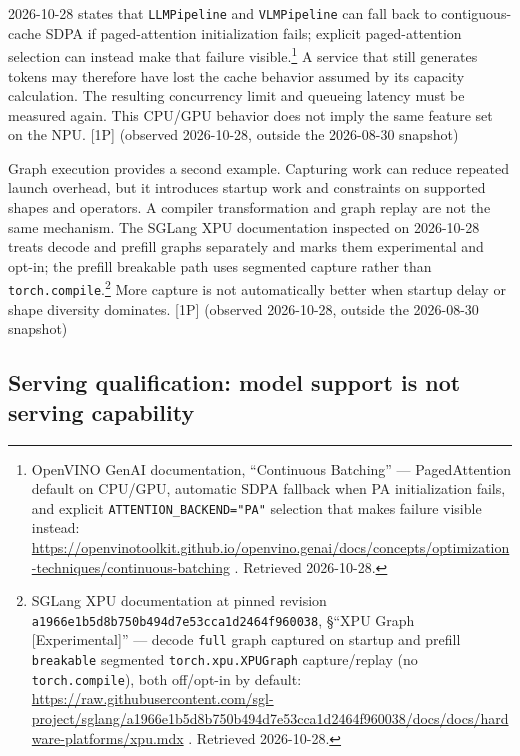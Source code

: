 2026-10-28 states that \texttt{LLMPipeline} and \texttt{VLMPipeline} can
fall back to contiguous-cache SDPA if paged-attention initialization
fails; explicit paged-attention selection can instead make that failure
visible.\footnote{OpenVINO GenAI documentation, ``Continuous Batching''
  --- PagedAttention default on CPU/GPU, automatic SDPA fallback when PA
  initialization fails, and explicit \texttt{ATTENTION\_BACKEND="PA"}
  selection that makes failure visible instead:
  \url{https://openvinotoolkit.github.io/openvino.genai/docs/concepts/optimization-techniques/continuous-batching}
  . Retrieved 2026-10-28.} A service that still generates tokens may
therefore have lost the cache behavior assumed by its capacity
calculation. The resulting concurrency limit and queueing latency must
be measured again. This CPU/GPU behavior does not imply the same feature
set on the NPU. \mbox{{[}1P{]}} (observed 2026-10-28, outside the 2026-08-30
snapshot)

Graph execution provides a second example. Capturing work can reduce
repeated launch overhead, but it introduces startup work and constraints
on supported shapes and operators. A compiler transformation and graph
replay are not the same mechanism. The SGLang XPU documentation
inspected on 2026-10-28 treats decode and prefill graphs separately and
marks them experimental and opt-in; the prefill breakable path uses
segmented capture rather than \texttt{torch.compile}.\footnote{SGLang
  XPU documentation at pinned revision
  \texttt{a1966e1b5d8b750b494d7e53cca1d2464f960038}, §``XPU Graph
  \mbox{{[}Experimental{]}}'' --- decode \texttt{full} graph captured on
  startup and prefill \texttt{breakable} segmented
  \texttt{torch.xpu.XPUGraph} capture/replay (no
  \texttt{torch.compile}), both off/opt-in by default:
  \url{https://raw.githubusercontent.com/sgl-project/sglang/a1966e1b5d8b750b494d7e53cca1d2464f960038/docs/docs/hardware-platforms/xpu.mdx}
  . Retrieved 2026-10-28.} More capture is not automatically better when
startup delay or shape diversity dominates. \mbox{{[}1P{]}} (observed
2026-10-28, outside the 2026-08-30 snapshot)

\subsection{Serving qualification: model support is not serving
capability}\label{serving-qualification-model-support-is-not-serving-capability}

